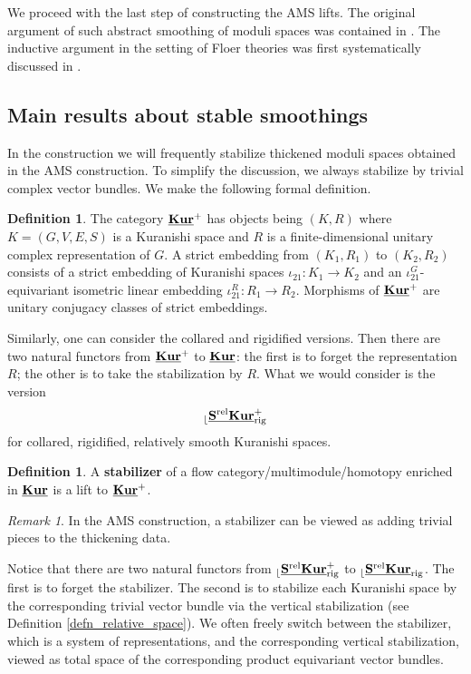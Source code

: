 \documentclass[reqno, 10pt]{amsart}
\numberwithin{equation}{section}
\numberwithin{equation}{section}
\theoremstyle{definition}
\newtheorem{defn}[thm]{Definition}
\theoremstyle{remark}
\newtheorem{rem}[thm]{Remark}
\newcommand{\beqn}{\begin{equation*}}
\newcommand{\eeqn}{\end{equation*}}
\renewcommand{\outer}{{}_{\lfloor}}
\newcommand{\uds}[1]{\underline{\smash{#1}}}
\begin{document}
We proceed with the last step of constructing the AMS lifts. The original argument of such abstract smoothing of moduli spaces was contained in \cite{AMS}. The inductive argument in the setting of Floer theories was first systematically discussed in \cite{Bai_Xu_Arnold}.

\subsection{Main results about stable smoothings}

In the construction we will frequently stabilize thickened moduli spaces obtained in the AMS construction. To simplify the discussion, we always stabilize by trivial complex vector bundles. We make the following formal definition.

\begin{defn}
The category $\uds{\bf Kur}^+$ has objects being $(K, R)$ where $K = (G, V, E, S)$ is a Kuranishi space and $R$ is a finite-dimensional unitary complex representation of $G$. A strict embedding from $(K_1, R_1)$ to $(K_2, R_2)$ consists of a strict embedding of Kuranishi spaces $\iota_{21}: K_1 \to K_2$ and an $\iota_{21}^G$-equivariant isometric linear embedding $\iota_{21}^R: R_1 \to R_2$. Morphisms of $\uds{\bf Kur}^+$ are unitary conjugacy classes of strict embeddings. 
\end{defn}

Similarly, one can consider the collared and rigidified versions. Then there are two natural functors from $\uds{\bf Kur}^+$ to $\uds{\bf Kur}$: the first is to forget the representation $R$; the other is to take the stabilization by $R$. What we would consider is the version
\beqn
\outer\uds{\bf S^{\rm rel}Kur}_{\rm rig}^+
\eeqn
for collared, rigidified, relatively smooth Kuranishi spaces.

\begin{defn}\label{defn_stabilizer}
A {\bf stabilizer} of a flow category/multimodule/homotopy enriched in $\uds{\bf Kur}$ is a lift to $\uds{\bf Kur}^+$.
\end{defn}

\begin{rem}
In the AMS construction, a stabilizer can be viewed as adding trivial pieces to the thickening data. 
\end{rem}

Notice that there are two natural functors from $\outer \uds{\bf S^{\rm rel} Kur}_{\rm rig}^+$ to $\outer \uds{\bf S^{\rm rel} Kur}_{\rm rig}$. The first is to forget the stabilizer. The second is to stabilize each Kuranishi space by the corresponding trivial vector bundle via the vertical stabilization (see Definition \ref{defn_relative_space}). We often freely switch between the stabilizer, which is a system of representations, and the corresponding vertical stabilization, viewed as total space of the corresponding product equivariant vector bundles.
\end{document}
